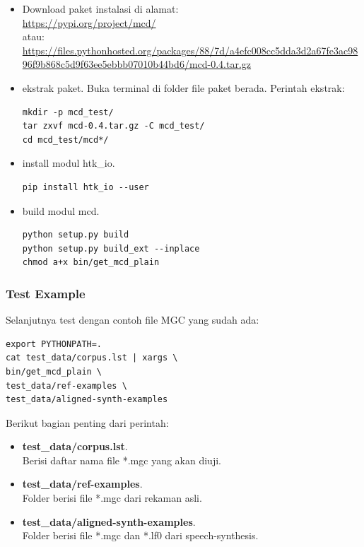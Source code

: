 \documentclass[12pt,]{article}
\begin{document}
	\begin{itemize}
		\item Download paket instalasi di alamat:\\
		\url{https://pypi.org/project/mcd/}\\
		atau:\\
		\url{https://files.pythonhosted.org/packages/88/7d/a4efc008cc5dda3d2a67fe3ac9896f9b868c5d9f63ee5ebbb07010b44bd6/mcd-0.4.tar.gz}

		\item ekstrak paket.
		Buka terminal di folder file paket berada.
		Perintah ekstrak:
		\begin{verbatim}
mkdir -p mcd_test/
tar zxvf mcd-0.4.tar.gz -C mcd_test/
cd mcd_test/mcd*/
		\end{verbatim}

		\item install modul htk\_io.
		\begin{verbatim}
pip install htk_io --user
		\end{verbatim}

		\item build modul mcd.
		\begin{verbatim}
python setup.py build
python setup.py build_ext --inplace
chmod a+x bin/get_mcd_plain
		\end{verbatim}

	\end{itemize}

	\subsubsection{Test Example}
	Selanjutnya test dengan contoh file MGC yang sudah ada:
	\begin{verbatim}
export PYTHONPATH=.
cat test_data/corpus.lst | xargs \
bin/get_mcd_plain \
test_data/ref-examples \
test_data/aligned-synth-examples
	\end{verbatim}

	Berikut bagian penting dari perintah:
	\begin{itemize}
		\item \textbf{test\_data/corpus.lst}.\\
		Berisi daftar nama file *.mgc yang akan diuji.

		\item \textbf{test\_data/ref-examples}.\\
		Folder berisi file *.mgc dari rekaman asli.

		\item \textbf{test\_data/aligned-synth-examples}.\\
		Folder berisi file *.mgc dan *.lf0 dari speech-synthesis.

	\end{itemize}
\end{document}
